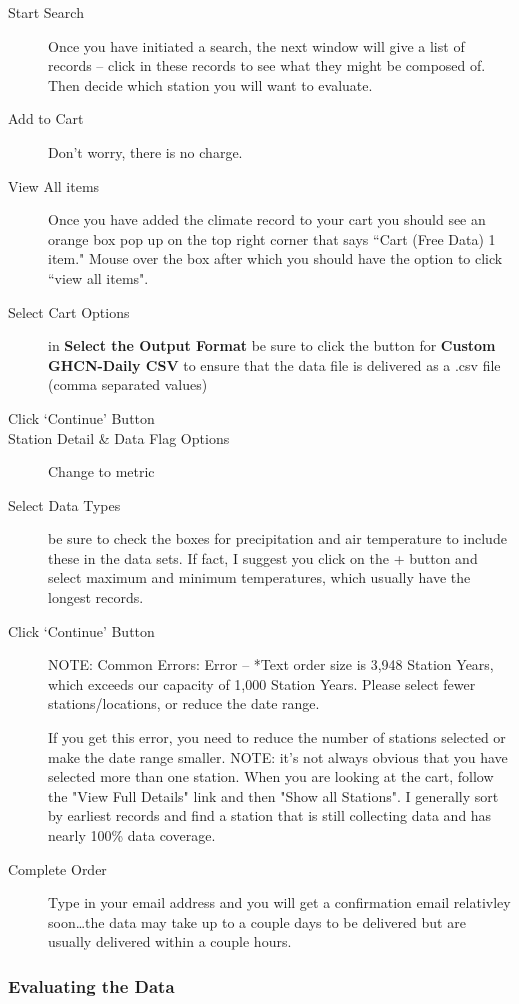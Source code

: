 \documentclass{article}\usepackage[]{graphicx}\usepackage[]{color}
\begin{document}
\begin{description}
  \item[Start Search] Once you have initiated a search, the next window will give a list of records -- click in these records to see what they might be composed of. Then decide which station you will want to evaluate.
  \item[Add to Cart] Don't worry, there is no charge. 
  \item[View All items] Once you have added the climate record to your cart you should see an orange box pop up on the top right corner that says ``Cart (Free Data) 1 item." Mouse over the box after which you should have the option to click ``view all items".
  \item[Select Cart Options] in \textbf{Select the Output Format} be sure to click the button for \textbf{Custom GHCN-Daily CSV} to ensure that the data file is delivered as a .csv file (comma separated values)
  \item[Click `Continue' Button]
  \item[Station Detail \& Data Flag Options] Change to metric
  \item[Select Data Types] be sure to check the boxes for precipitation and air temperature to include these in the data sets. If fact, I suggest you click on the + button and select maximum and minimum temperatures, which usually have the longest records.
  \item[Click `Continue' Button] NOTE: Common Errors:
Error -- *Text order size is 3,948 Station Years, which exceeds our capacity of 1,000 Station Years. Please select fewer stations/locations, or reduce the date range.

If you get this error, you need to reduce the number of stations selected or make the date range smaller. NOTE: it's not always obvious that you have selected more than one station. When you are looking at the cart, follow the "View Full Details" link and then "Show all Stations". I generally sort by earliest records and find a station that is still collecting data and has nearly 100\% data coverage. 
  
  \item[Complete Order] Type in your email address and you will get a confirmation email relativley soon\ldots the data may take up to a couple days to be delivered but are usually delivered within a couple hours.
\end{description}


\subsubsection{Evaluating the Data}
\end{document}
